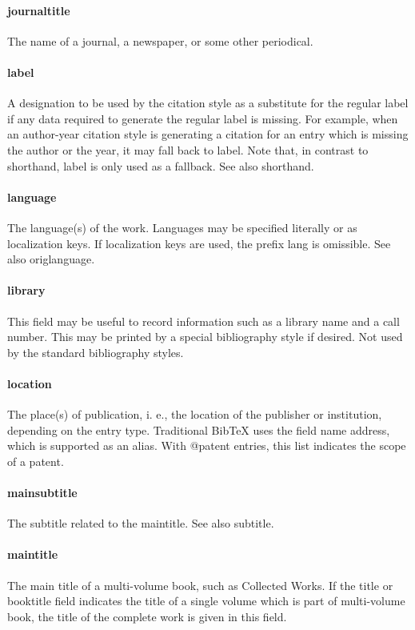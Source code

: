 \documentclass[a4paper,12pt]{report}
\begin{document}
\paragraph{journaltitle}
The name of a journal, a newspaper, or some other periodical.

\paragraph{label}
A designation to be used by the citation style as a substitute for the regular label if any
data required to generate the regular label is missing. For example, when an author-year
citation style is generating a citation for an entry which is missing the author or the year,
it may fall back to label. Note that, in contrast to shorthand, label
is only used as a fallback. See also shorthand.

\paragraph{language}
The language(s) of the work. Languages may be specified literally or as localization keys. If
localization keys are used, the prefix lang is omissible. See also origlanguage.

\paragraph{library}
This field may be useful to record information such as a library name and a call number.
This may be printed by a special bibliography style if desired. Not used by the standard
bibliography styles.

\paragraph{location}
The place(s) of publication, i. e., the location of the publisher or institution, depending
on the entry type. Traditional BibTeX uses the field name address, which is supported as
an alias. With @patent entries, this list indicates the scope of a patent.

\paragraph{mainsubtitle}
The subtitle related to the maintitle. See also subtitle.

\paragraph{maintitle}
The main title of a multi-volume book, such as Collected Works. If the title or booktitle
field indicates the title of a single volume which is part of multi-volume book, the title of
the complete work is given in this field.
\end{document}

